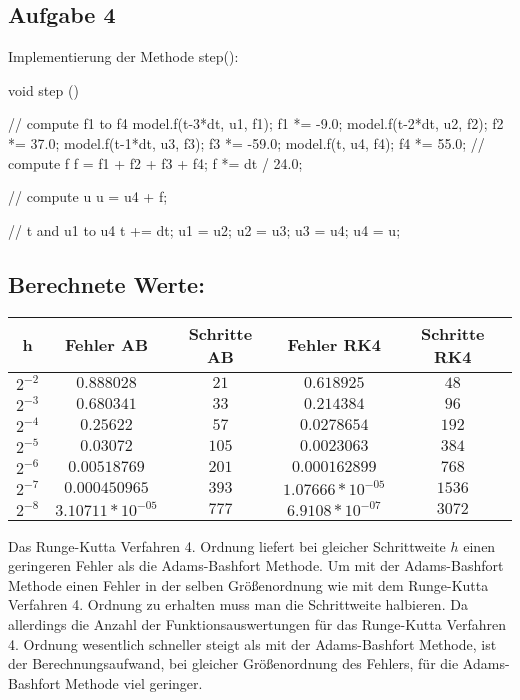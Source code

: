 \documentclass[10pt,oneside,a4paper]{scrartcl}
\begin{document}
\subsection*{Aufgabe 4}
Implementierung der Methode step(): \\

\begin{cppcode}
  void step ()
  {
    // compute f1 to f4
    model.f(t-3*dt, u1, f1);
    f1 *= -9.0;
    model.f(t-2*dt, u2, f2);
    f2 *= 37.0;
    model.f(t-1*dt, u3, f3);
    f3 *= -59.0;
    model.f(t, u4, f4);
    f4 *= 55.0;
    // compute f
    f = f1 + f2 + f3 + f4;
    f *= dt / 24.0;

    // compute u
    u = u4 + f;

    // t and u1 to u4
    t += dt;
    u1 = u2;
    u2 = u3;
    u3 = u4;
    u4 = u;
  }
\end{cppcode}

    \subsection*{Berechnete Werte:}
    
    \begin{center}
        \begin{tabular}[htbp]{c|c|c|c|c}
        h & Fehler AB & Schritte AB & Fehler RK4 & Schritte RK4
        \\
        \hline
        $2^{-2}$ & $0.888028$ & $21$ & $0.618925$ & $48$ \\
        $2^{-3}$ & $0.680341$ & $33$ & $0.214384$ & $96$ \\
        $2^{-4}$ & $0.25622$ & $57$ & $0.0278654$ & $192$ \\
        $2^{-5}$ & $0.03072$ & $105$ & $0.0023063$ & $384$ \\
        $2^{-6}$ & $0.00518769$ & $201$ & $0.000162899$ & $768$ \\
        $2^{-7}$ & $0.000450965$ & $393$ & $1.07666 * 10^{-05}$ & $1536$ \\
        $2^{-8}$ & $3.10711 * 10^{-05}$ & $777$ & $6.9108 * 10^{-07}$ & $3072$
        \\
        \end{tabular}
    \end{center}
    Das Runge-Kutta Verfahren 4. Ordnung liefert bei gleicher Schrittweite $h$
    einen geringeren Fehler als die Adams-Bashfort Methode. Um mit der
    Adams-Bashfort Methode einen Fehler in der selben Größenordnung wie mit dem
    Runge-Kutta Verfahren 4. Ordnung zu erhalten muss man die Schrittweite
    halbieren. Da allerdings die Anzahl der Funktionsauswertungen für das
    Runge-Kutta Verfahren 4. Ordnung wesentlich schneller steigt als mit der 
    Adams-Bashfort Methode, ist der Berechnungsaufwand, bei gleicher
    Größenordnung des Fehlers, für die Adams-Bashfort Methode viel geringer.
\end{document}
